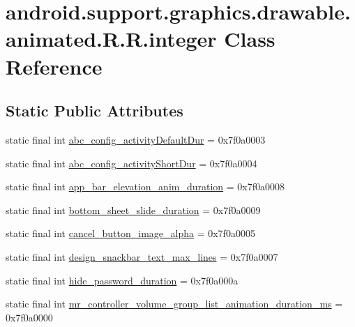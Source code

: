 \hypertarget{classandroid_1_1support_1_1graphics_1_1drawable_1_1animated_1_1_r_1_1integer}{
\section{android.support.graphics.drawable.animated.R.R.integer Class Reference}
\label{classandroid_1_1support_1_1graphics_1_1drawable_1_1animated_1_1_r_1_1integer}
}
\subsection*{Static Public Attributes}
\begin{CompactItemize}
\item 
static final int \hyperlink{classandroid_1_1support_1_1graphics_1_1drawable_1_1animated_1_1_r_1_1integer_c94a8ec52a8c23063fd8d1bc0d701866}{abc\_\-config\_\-activityDefaultDur} = 0x7f0a0003
\item 
static final int \hyperlink{classandroid_1_1support_1_1graphics_1_1drawable_1_1animated_1_1_r_1_1integer_c93392a68af783e2d5e027494f251713}{abc\_\-config\_\-activityShortDur} = 0x7f0a0004
\item 
static final int \hyperlink{classandroid_1_1support_1_1graphics_1_1drawable_1_1animated_1_1_r_1_1integer_3f0b0eb76308ddc84eedc4c5c8c4e674}{app\_\-bar\_\-elevation\_\-anim\_\-duration} = 0x7f0a0008
\item 
static final int \hyperlink{classandroid_1_1support_1_1graphics_1_1drawable_1_1animated_1_1_r_1_1integer_4bb107f7121545718e8eb01da54c30c9}{bottom\_\-sheet\_\-slide\_\-duration} = 0x7f0a0009
\item 
static final int \hyperlink{classandroid_1_1support_1_1graphics_1_1drawable_1_1animated_1_1_r_1_1integer_cab4cb6779429d95ff072fa2aecfad53}{cancel\_\-button\_\-image\_\-alpha} = 0x7f0a0005
\item 
static final int \hyperlink{classandroid_1_1support_1_1graphics_1_1drawable_1_1animated_1_1_r_1_1integer_fde5807f6121f95f0cdd57437b1c90eb}{design\_\-snackbar\_\-text\_\-max\_\-lines} = 0x7f0a0007
\item 
static final int \hyperlink{classandroid_1_1support_1_1graphics_1_1drawable_1_1animated_1_1_r_1_1integer_0bafddf93b8e7ef9c9ac433117a5bd20}{hide\_\-password\_\-duration} = 0x7f0a000a
\item 
static final int \hyperlink{classandroid_1_1support_1_1graphics_1_1drawable_1_1animated_1_1_r_1_1integer_7e8f4a3cae6e7ac1eff4bef4d0f125d2}{mr\_\-controller\_\-volume\_\-group\_\-list\_\-animation\_\-duration\_\-ms} = 0x7f0a0000

\end{CompactItemize}
